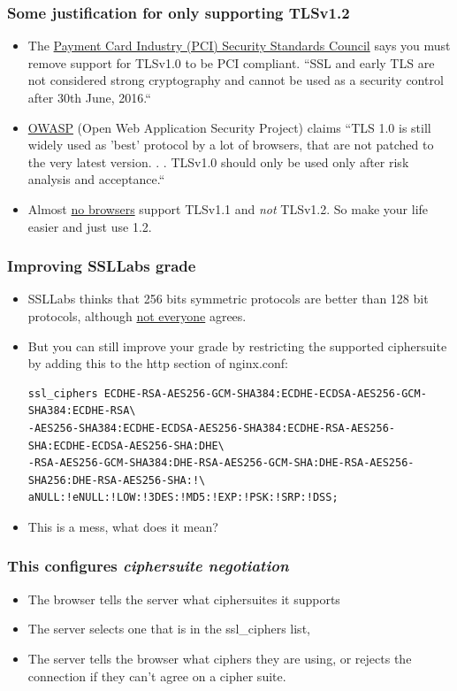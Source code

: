 \documentclass[9pt]{beamer}
\begin{document}
\begin{frame}[fragile]
\frametitle{Some justification for only supporting TLSv1.2}
\begin{itemize}
\item The \href{https://www.pcisecuritystandards.org/}{Payment Card Industry (PCI) Security Standards Council} says you must remove support for TLSv1.0 to be PCI compliant. ``SSL and early TLS are not considered strong cryptography and cannot be used as a security control after 30th June, 2016.``
\pause
\item \href{https://www.owasp.org/index.php/Transport_Layer_Protection_Cheat_Sheet}{OWASP} (Open Web Application Security Project) claims ``TLS 1.0 is still widely used as 'best' protocol by a lot of browsers, that are not patched to the very latest version.  . . TLSv1.0 should only be used only after risk analysis and acceptance.``
\pause
\item Almost \href{https://en.wikipedia.org/wiki/Transport_Layer_Security\#Web_browsers}{no browsers} support TLSv1.1 and \emph{not} TLSv1.2. So make your life easier and just use 1.2.
\end{itemize}
\end{frame}

\begin{frame}[fragile]
\frametitle{Improving SSLLabs grade}
\begin{itemize}
\item SSLLabs thinks that 256 bits symmetric protocols are better than 128 bit protocols, although \href{https://www.schneier.com/blog/archives/2009/07/another_new_aes.html}{not everyone} agrees.
\pause 
\item But you can still improve your grade by restricting the supported ciphersuite by adding this to the http section of nginx.conf:
\begin{verbatim}
ssl_ciphers ECDHE-RSA-AES256-GCM-SHA384:ECDHE-ECDSA-AES256-GCM-SHA384:ECDHE-RSA\
-AES256-SHA384:ECDHE-ECDSA-AES256-SHA384:ECDHE-RSA-AES256-SHA:ECDHE-ECDSA-AES256-SHA:DHE\
-RSA-AES256-GCM-SHA384:DHE-RSA-AES256-GCM-SHA:DHE-RSA-AES256-SHA256:DHE-RSA-AES256-SHA:!\
aNULL:!eNULL:!LOW:!3DES:!MD5:!EXP:!PSK:!SRP:!DSS;
\end{verbatim}
\pause
\item This is a mess, what does it mean?
\end{itemize}
\end{frame}

\begin{frame}
\frametitle{This configures \emph{ciphersuite negotiation}}
\begin{itemize}
\item The browser tells the server what ciphersuites it supports
\pause
\item The server selects one that is in the ssl\_ciphers list,
\pause
\item The server tells the browser what ciphers they are using, or rejects the connection if they can't agree on a cipher suite.
\end{itemize}
\end{frame}
\end{document}
